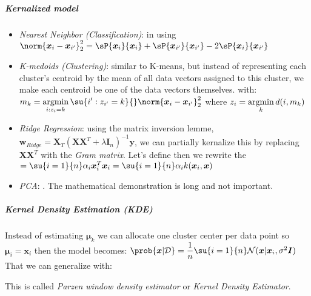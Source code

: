 \subparagraph{Kernalized model}
\begin{itemize}
    \item \emph{Nearest Neighbor (Classification)}: in using $\norm{\bm{x}_{i}
        -\bm{x}_{i'}}^{2}_{2} = \sP{\bm{x}_{i}}{\bm{x}_{i}}  +
        \sP{\bm{x}_{i'}}{\bm{x}_{i'}} -2\sP{\bm{x}_{i}}{\bm{x}_{i'}}$
    \item \emph{K-medoids (Clustering)}: similar to K-means, but instead of
        representing each cluster's centroid by the mean of all data vectors
        assigned to this cluster, we make each centroid be one of the data 
        vectors themselves.  with: $m_{k} = 
        \displaystyle\argmin_{i:z_{i}=k}\su{i':z_{i'}=k}{}
        \norm{\bm{x}_{i}-\bm{x}_{i'}}^{2}_{2}$ where $z_{i} = \displaystyle\operatorname*{argmin}_{k} 
        d(i,m_{k})$
    \item \emph{Ridge Regression}: using the matrix inversion lemme, $\bm{w}_{
        Ridge} = \bm{X}_{T}\left(\bm{X}\bm{X}^{T}+\lambda\bm{I}_{n}\right)^{
        -1}\bm{y}$, we can partially kernalize this by replacing $\bm{X}
        \bm{X}^{T}$ with the \emph{Gram matrix}. Let's define  then we rewrite the $=\su{i=1}{n}\alpha_{i}\bm{x}_{i}^{T}\bm{x}
        _{i} = \su{i=1}{n}\alpha_{i}k(\bm{x}_{i},\bm{x})$
    \item \emph{PCA}: . The mathematical demonstration is long and not 
        important.
\end{itemize}
\subparagraph{Kernel Density Estimation (KDE)}
Instead of estimating $\bm{\mu}_{k}$ we can allocate one cluster center per data point 
so $\bm{\mu}_{i} = \bm{x}_{i}$ then the model becomes: $\prob{\bm{x}|\mathcal{D}} =
\dfrac{1}{n}\su{i=1}{n}\mathcal{N}(\bm{x}|\bm{x}_{i}, \sigma^{2}\bm{I})$
That we can generalize with:
\begin{center}
\end{center}
This is called \emph{Parzen window density estimator} or \emph{Kernel Density 
Estimator}.\\




